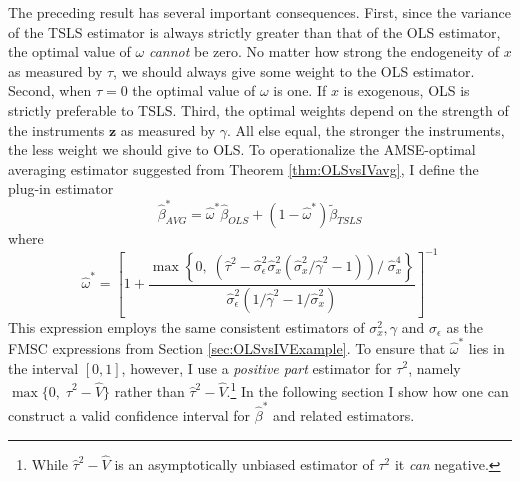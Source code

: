 The preceding result has several important consequences. 
First, since the variance of the TSLS estimator is always strictly greater than that of the OLS estimator, the optimal value of $\omega$ \emph{cannot} be zero. 
No matter how strong the endogeneity of $x$ as measured by $\tau$, we should always give some weight to the OLS estimator. 
Second, when $\tau = 0$ the optimal value of $\omega$ is one. If $x$ is exogenous, OLS is strictly preferable to TSLS. 
Third, the optimal weights depend on the strength of the instruments $\mathbf{z}$ as measured by $\gamma$.
All else equal, the stronger the instruments, the less weight we should give to OLS.
To operationalize the AMSE-optimal averaging estimator suggested from Theorem \ref{thm:OLSvsIVavg}, I define the plug-in estimator 
\begin{equation}
	\widehat{\beta}^*_{AVG} = \widehat{\omega}^* \widehat{\beta}_{OLS} + (1 - \widehat{\omega}^*)\widetilde{\beta}_{TSLS}
	\label{eq:OLSvsIV_AVG1}
\end{equation}
where
\begin{equation}
\widehat{\omega }^* = \left[1 + \frac{\max \left\{0, \; \left(\widehat{\tau}^2 - \widehat{\sigma}_\epsilon^2\widehat{\sigma}_x^2  \left(\widehat{\sigma}_x^2/\widehat{\gamma}^2 - 1 \right) \right)/\;\widehat{\sigma}_x^4 \right\}}{\widehat{\sigma}_\epsilon^2 (1/\widehat{\gamma}^2 - 1/\widehat{\sigma}_x^2)}\right]^{-1}
	\label{eq:OLSvsIV_AVG2}
\end{equation}
This expression employs the same consistent estimators of $\sigma_x^2, \gamma$ and $\sigma_{\epsilon}$ as the FMSC expressions from Section \ref{sec:OLSvsIVExample}.
To ensure that $\widehat{\omega}^*$ lies in the interval $[0,1]$, however, I use a \emph{positive part} estimator for $\tau^2$, namely $\max\{0, \; \widehat{\tau}^2 - \widehat{V}\}$ rather than $\widehat{\tau}^2 - \widehat{V}$.\footnote{While $\widehat{\tau}^2 - \widehat{V}$ is an asymptotically unbiased estimator of $\tau^2$ it \emph{can} negative.}
In the following section I show how one can construct a valid confidence interval for $\widehat{\beta}^*$ and related estimators.
